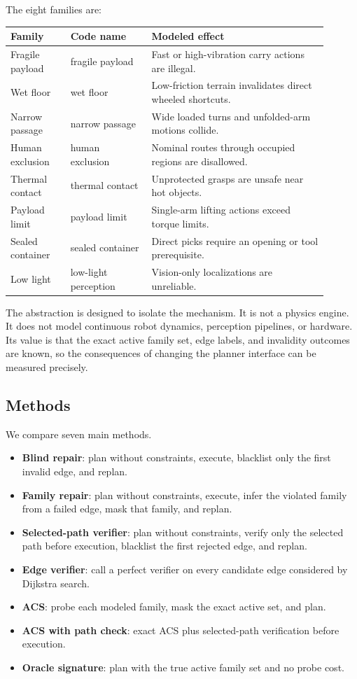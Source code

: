 \documentclass{article}
\newcommand{\ACS}{\textsc{ACS}}
\begin{document}
The eight families are:
\begin{center}
\footnotesize
\begin{tabular}{p{0.17\linewidth}p{0.23\linewidth}p{0.50\linewidth}}
\toprule
Family & Code name & Modeled effect \\
\midrule
Fragile payload & fragile payload & Fast or high-vibration carry actions are illegal. \\
Wet floor & wet floor & Low-friction terrain invalidates direct wheeled shortcuts. \\
Narrow passage & narrow passage & Wide loaded turns and unfolded-arm motions collide. \\
Human exclusion & human exclusion & Nominal routes through occupied regions are disallowed. \\
Thermal contact & thermal contact & Unprotected grasps are unsafe near hot objects. \\
Payload limit & payload limit & Single-arm lifting actions exceed torque limits. \\
Sealed container & sealed container & Direct picks require an opening or tool prerequisite. \\
Low light & low-light perception & Vision-only localizations are unreliable. \\
\bottomrule
\end{tabular}
\end{center}

The abstraction is designed to isolate the mechanism. It is not a physics engine. It does not model continuous robot dynamics, perception pipelines, or hardware. Its value is that the exact active family set, edge labels, and invalidity outcomes are known, so the consequences of changing the planner interface can be measured precisely.

\subsection{Methods}

We compare seven main methods.
\begin{itemize}
    \item \textbf{Blind repair}: plan without constraints, execute, blacklist only the first invalid edge, and replan.
    \item \textbf{Family repair}: plan without constraints, execute, infer the violated family from a failed edge, mask that family, and replan.
    \item \textbf{Selected-path verifier}: plan without constraints, verify only the selected path before execution, blacklist the first rejected edge, and replan.
    \item \textbf{Edge verifier}: call a perfect verifier on every candidate edge considered by Dijkstra search.
    \item \textbf{\ACS{}}: probe each modeled family, mask the exact active set, and plan.
    \item \textbf{\ACS{} with path check}: exact \ACS{} plus selected-path verification before execution.
    \item \textbf{Oracle signature}: plan with the true active family set and no probe cost.
\end{itemize}
\end{document}
